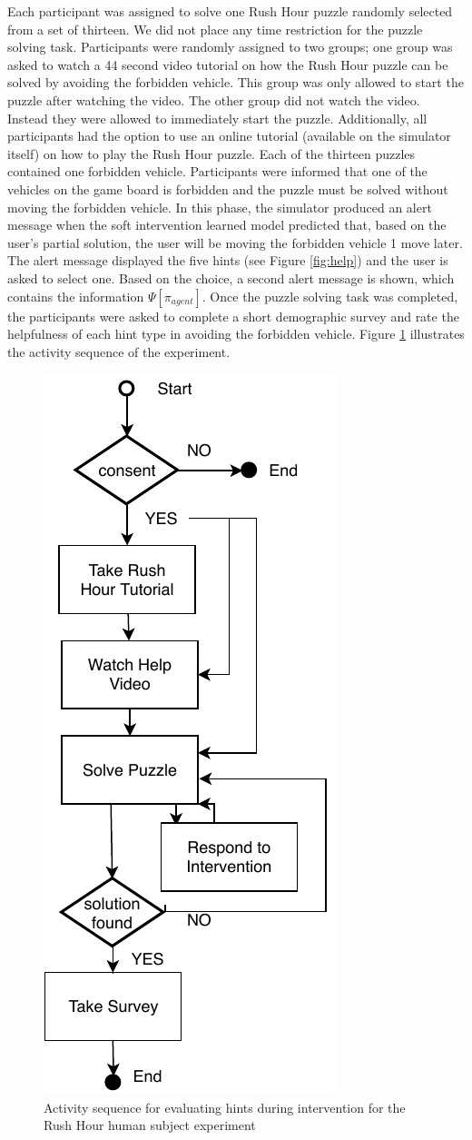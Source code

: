 Each participant was assigned to solve one Rush Hour puzzle randomly selected from a set of thirteen. We did not place any time restriction for the puzzle solving task. Participants were randomly assigned to two groups; one group was asked to watch a 44 second video tutorial on how the Rush Hour puzzle can be solved by avoiding the forbidden vehicle. This group was only allowed to start the puzzle after watching the video. The other group did not watch the video. Instead they were allowed to immediately start the puzzle. Additionally, all participants had the option to use an online tutorial (available on the simulator itself) on how to play the Rush Hour puzzle. Each of the thirteen puzzles contained one forbidden vehicle. Participants were informed that one of the vehicles on the game board is forbidden and the puzzle must be solved without moving the forbidden vehicle. In this phase, the simulator produced an alert message when the soft intervention learned model predicted that, based on the user's partial solution, the user will be moving the forbidden vehicle 1 move later. The alert message displayed the five hints (see Figure \ref{fig:help}) and the user is asked to select one. Based on the choice, a second alert message is shown, which contains the information $\Psi[\pi_{agent}]$. Once the puzzle solving task was completed, the participants were asked to complete a short demographic survey and rate the helpfulness of each hint type in avoiding the forbidden vehicle. Figure \ref{fig:phase2} illustrates the activity sequence of the experiment.

\begin{figure}[!htb]
  \centering
  \includegraphics[height=0.6\columnwidth]{img/phase2.pdf}
  \caption{Activity sequence for evaluating hints during intervention for the Rush Hour human subject experiment}
  \label{fig:phase2}
\end{figure}

